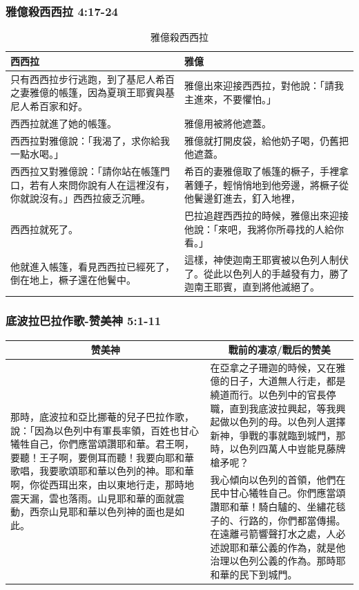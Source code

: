 \subsubsection{雅億殺西西拉 4:17-24}
\begin{table}[H]
\centering
\begin{tabular}{p{8.5cm}|p{8.5cm}}\hline\hline
西西拉&雅億\\\hline
只有西西拉步行逃跑，到了基尼人希百之妻雅億的帳篷，因為夏瑣王耶賓與基尼人希百家和好。
&雅億出來迎接西西拉，對他說：「請我主進來，不要懼怕。」\\\hline
西西拉就進了她的帳篷。&雅億用被將他遮蓋。\\\hline
西西拉對雅億說：「我渴了，求你給我一點水喝。」&雅億就打開皮袋，給他奶子喝，仍舊把他遮蓋。\\\hline
西西拉又對雅億說：「請你站在帳篷門口，若有人來問你說有人在這裡沒有，你就說沒有。」西西拉疲乏沉睡。&希百的妻雅億取了帳篷的橛子，手裡拿著錘子，輕悄悄地到他旁邊，將橛子從他鬢邊釘進去，釘入地裡，\\\hline
西西拉就死了。&巴拉追趕西西拉的時候，雅億出來迎接他說：「來吧，我將你所尋找的人給你看。」\\\hline
他就進入帳篷，看見西西拉已經死了，倒在地上，橛子還在他鬢中。&這樣，神使迦南王耶賓被以色列人制伏了。從此以色列人的手越發有力，勝了迦南王耶賓，直到將他滅絕了。\\\hline
 \end{tabular}
\caption{雅億殺西西拉}
\end{table}



\subsubsection{底波拉巴拉作歌-赞美神 5:1-11}
\begin{table}[H]
\centering
\begin{tabular}{p{6.75cm}|p{10.750cm}}\hline\hline
\multicolumn{1}{c|}{赞美神}&\multicolumn{1}{c}{戰前的凄凉/戰后的赞美}\\\hline
\multirow{2}{6.9cm}{那時，底波拉和亞比挪菴的兒子巴拉作歌，說：「因為以色列中有軍長率領，百姓也甘心犧牲自己，你們應當頌讚耶和華。君王啊，要聽！王子啊，要側耳而聽！我要向耶和華歌唱，我要歌頌耶和華以色列的神。耶和華啊，你從西珥出來，由以東地行走，那時地震天漏，雲也落雨。山見耶和華的面就震動，西奈山見耶和華以色列神的面也是如此。}&在亞拿之子珊迦的時候，又在雅億的日子，大道無人行走，都是繞道而行。以色列中的官長停職，直到我底波拉興起，等我興起做以色列的母。以色列人選擇新神，爭戰的事就臨到城門，那時，以色列四萬人中豈能見藤牌槍矛呢？\\\cline{2-2}
&我心傾向以色列的首領，他們在民中甘心犧牲自己。你們應當頌讚耶和華！騎白驢的、坐繡花毯子的、行路的，你們都當傳揚。在遠離弓箭響聲打水之處，人必述說耶和華公義的作為，就是他治理以色列公義的作為。那時耶和華的民下到城門。\\\hline
\end{tabular}
\end{table} 

